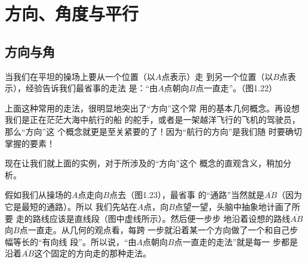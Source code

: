 \section{方向、角度与平行}
\subsection{方向与角}
当我们在平坦的操场上要从一个位置（以$A$点表示）走
到另一个位置（以$B$点表示），经验告诉我们最省事的走法
是：“由$A$点朝向$B$点一直走”。（图1.22）

\begin{figure}[htp]
	\centering
{}
	\caption{}
\end{figure}

上面这种常用的走法，很明显地突出了“方向”这个常
用的基本几何概念。再设想我们是正在茫茫大海中航行的船
的舵手，或者是一架越洋飞行的飞机的驾驶员，那么“方向”这
个概念就更是至关紧要的了！因为“航行的方向”是我们随
时要确切掌握的要素！

现在让我们就上面的实例，对于所涉及的“方向”这个
概念的直观含义，稍加分析。

假如我们从操场的$A$点走向$B$点去（图1.23），最省事
的“通路”当然就是$\overline{AB}$（因为它是最短的通路）。所以
我们先站在$A$点，向$B$点望一望，头脑中抽象地计画了所要
走的路线应该是直线段（图中虚线所示）。然后便一步步
地沿着设想的路线$\overline{AB}$向$B$点一直走。从几何的观点看，每跨
一步就沿着某一个方向做了一个和自己步幅等长的“有向线
段”。所以说，“由$A$点朝向$B$点一直走的走法”就是每一
步都是沿着$\overline{AB}$这个固定的方向走的那种走法。


\begin{figure}[htp]
	\centering
{}
	\caption{}
\end{figure}

